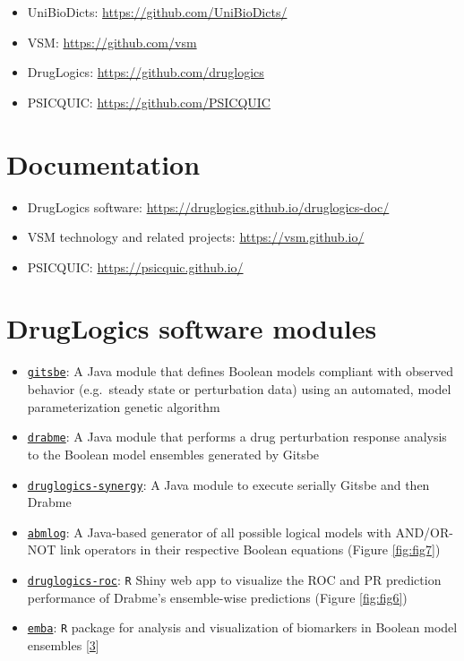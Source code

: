 \documentclass[
  12pt,
]{book}
\providecommand{\tightlist}{%
  \setlength{\itemsep}{0pt}\setlength{\parskip}{0pt}}
\begin{document}
\begin{itemize}
\tightlist
\item
  UniBioDicts: \url{https://github.com/UniBioDicts/}
\item
  VSM: \url{https://github.com/vsm}
\item
  DrugLogics: \url{https://github.com/druglogics}
\item
  PSICQUIC: \url{https://github.com/PSICQUIC}
\end{itemize}

\hypertarget{doc-links}{%
\section*{Documentation}\label{doc-links}}

\begin{itemize}
\tightlist
\item
  DrugLogics software: \url{https://druglogics.github.io/druglogics-doc/}
\item
  VSM technology and related projects: \url{https://vsm.github.io/}
\item
  PSICQUIC: \url{https://psicquic.github.io/}
\end{itemize}

\hypertarget{druglogics-soft-links}{%
\section*{DrugLogics software modules}\label{druglogics-soft-links}}

\begin{itemize}
\tightlist
\item
  \href{https://github.com/druglogics/gitsbe}{\texttt{gitsbe}}: A Java module that defines Boolean models compliant with observed behavior (e.g.~steady state or perturbation data) using an automated, model parameterization genetic algorithm
\item
  \href{https://github.com/druglogics/drabme}{\texttt{drabme}}: A Java module that performs a drug perturbation response analysis to the Boolean model ensembles generated by Gitsbe
\item
  \href{https://github.com/druglogics/druglogics-synergy}{\texttt{druglogics-synergy}}: A Java module to execute serially Gitsbe and then Drabme
\item
  \href{https://github.com/druglogics/abmlog}{\texttt{abmlog}}: A Java-based generator of all possible logical models with AND/OR-NOT link operators in their respective Boolean equations (Figure \ref{fig:fig7})
\item
  \href{https://github.com/druglogics/druglogics-roc}{\texttt{druglogics-roc}}: \texttt{R} Shiny web app to visualize the ROC and PR prediction performance of Drabme's ensemble-wise predictions (Figure \ref{fig:fig6})
\item
  \href{https://github.com/bblodfon/emba/}{\texttt{emba}}: \texttt{R} package for analysis and visualization of biomarkers in Boolean model ensembles {[}\protect\hyperlink{ref-Zobolas2020}{3}{]}
\end{itemize}
\end{document}
